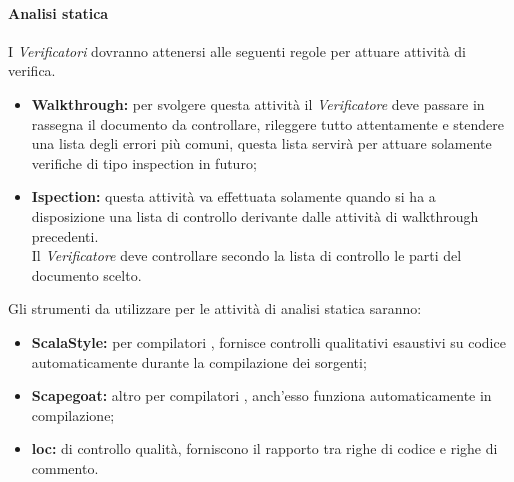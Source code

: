 \documentclass{scalatekids-article}
\begin{document}
\paragraph{Analisi statica}
\label{sec:AnalisStatica}
I \textit{Verificatori} dovranno attenersi alle seguenti regole per attuare attività di verifica.
\begin{itemize}
  \item \textbf{Walkthrough:} per svolgere questa attività il \textit{Verificatore} deve passare in rassegna il documento da controllare, rileggere tutto attentamente e stendere una lista degli errori più comuni, questa lista servirà per attuare solamente verifiche di tipo inspection in futuro;
  \item \textbf{Ispection:} questa attività va effettuata solamente quando si ha a disposizione una lista di controllo derivante dalle attività di walkthrough precedenti.\\
  Il \textit{Verificatore} deve controllare secondo la lista di controllo le parti del documento scelto.
\end{itemize}
Gli strumenti da utilizzare per le attività di analisi statica saranno:
\begin{itemize}
\item\textbf{ScalaStyle:}  per compilatori , fornisce controlli qualitativi esaustivi su codice automaticamente durante la compilazione dei sorgenti;
\item\textbf{Scapegoat:} altro  per compilatori , anch'esso funziona automaticamente in compilazione;
\item\textbf{loc:}  di controllo qualità, forniscono il rapporto tra righe di codice e righe di commento.
\end{itemize}
\end{document}

